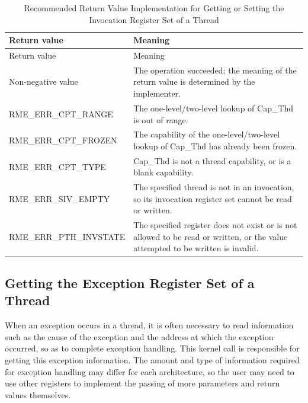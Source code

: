 \begin{xltabular}{\textwidth}{@{}>{\hsize\raggedright\arraybackslash}X>{\hsize\raggedright\arraybackslash}X@{}}
\caption{Recommended Return Value Implementation for Getting or Setting the Invocation Register Set of a Thread}\label{tab:8-114-get-or-set-thread-migration-call-register-set-suggested-return-values}\\
\toprule
Return value & Meaning\tabularnewline
\endfirsthead
\toprule
Return value & Meaning\tabularnewline
\midrule
\endhead
\bottomrule
\endlastfoot
    Non-negative value & The operation succeeded; the meaning of the return value is determined by the implementer.\tabularnewline
    RME\_ERR\_CPT\_RANGE & The one-level/two-level lookup of Cap\_Thd is out of range.\tabularnewline
    RME\_ERR\_CPT\_FROZEN & The capability of the one-level/two-level lookup of Cap\_Thd has already been frozen.\tabularnewline
    RME\_ERR\_CPT\_TYPE & Cap\_Thd is not a thread capability, or is a blank capability.\tabularnewline
    RME\_ERR\_SIV\_EMPTY & The specified thread is not in an invocation, so its invocation register set cannot be read or written.\tabularnewline
    RME\_ERR\_PTH\_INVSTATE & The specified register does not exist or is not allowed to be read or written, or the value attempted to be written is invalid.\tabularnewline
\end{xltabular}
\nopagebreak[4]

\subsection{Getting the Exception Register Set of a Thread}\label{subsec:8-get-thread-exception-register-set}

When an exception occurs in a thread, it is often necessary to read information such as the cause of the exception and the address at which the exception occurred, so as to complete exception handling. This kernel call is responsible for getting this exception information. The amount and type of information required for exception handling may differ for each architecture, so the user may need to use other registers to implement the passing of more parameters and return values themselves.

